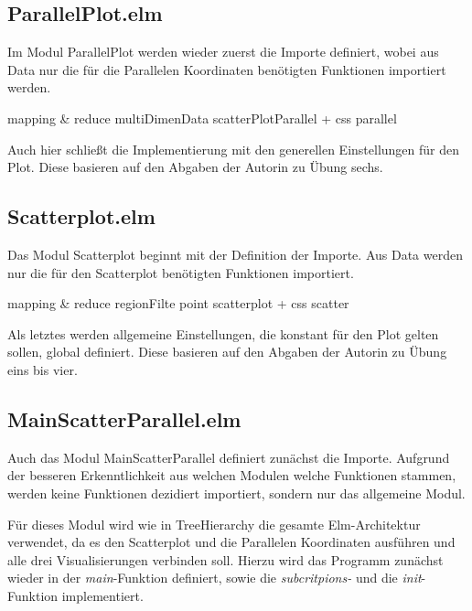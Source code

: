 \documentclass[usegeometry=true]{scrartcl}
\begin{document}
\subsection{ParallelPlot.elm}
Im Modul ParallelPlot werden wieder zuerst die Importe definiert, wobei aus Data nur die für die Parallelen Koordinaten benötigten Funktionen importiert werden. 

mapping & reduce
multiDimenData
scatterPlotParallel + css parallel

Auch hier schließt die Implementierung mit den generellen Einstellungen für den Plot. Diese basieren auf den Abgaben der Autorin zu Übung sechs. 

\subsection{Scatterplot.elm}
Das Modul Scatterplot beginnt mit der Definition der Importe. Aus Data werden nur die für den Scatterplot benötigten Funktionen importiert. 

mapping & reduce
regionFilte
point
scatterplot + css scatter

Als letztes werden allgemeine Einstellungen, die konstant für den Plot gelten sollen, global definiert. 
Diese basieren auf den Abgaben der Autorin zu Übung eins bis vier.

\subsection{MainScatterParallel.elm}
Auch das Modul MainScatterParallel definiert zunächst die Importe. 
Aufgrund der besseren Erkenntlichkeit aus welchen Modulen welche Funktionen stammen, werden keine Funktionen dezidiert importiert, sondern nur das allgemeine Modul. 

Für dieses Modul wird wie in TreeHierarchy die gesamte Elm-Architektur verwendet, da es den Scatterplot und die Parallelen Koordinaten ausführen und alle drei Visualisierungen verbinden soll.
Hierzu wird das Programm zunächst wieder in der \textit{main}-Funktion definiert, sowie die \textit{subcritpions-} und die \textit{init}-Funktion implementiert.
\end{document}
